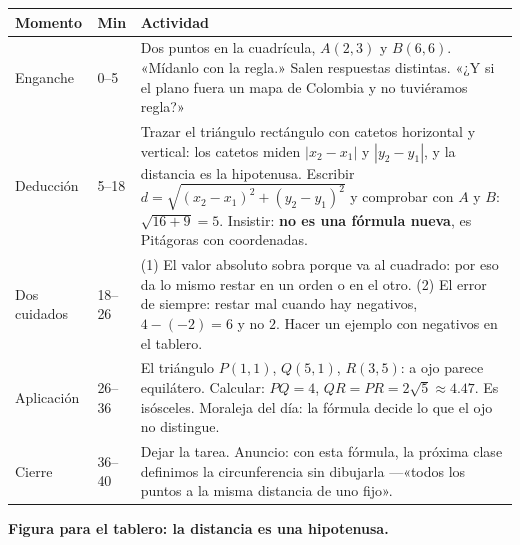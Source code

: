 \documentclass[11pt]{article}
\begin{document}
\begin{center}
{\renewcommand{\arraystretch}{1.3}
\begin{tabularx}{\linewidth}{@{}l l X@{}}
  \toprule
  \textbf{Momento} & \textbf{Min} & \textbf{Actividad}\\
  \midrule
  Enganche & 0--5 & Dos puntos en la cuadrícula, $A(2,3)$ y $B(6,6)$. «Mídanlo con la
    regla.» Salen respuestas distintas. «¿Y si el plano fuera un mapa de Colombia y no
    tuviéramos regla?»\\
  Deducción & 5--18 & Trazar el triángulo rectángulo con catetos horizontal y vertical:
    los catetos miden $|x_2 - x_1|$ y $|y_2 - y_1|$, y la distancia es la hipotenusa.
    Escribir $d = \sqrt{(x_2-x_1)^2 + (y_2-y_1)^2}$ y comprobar con $A$ y $B$: $\sqrt{16+9}
    = 5$. Insistir: \textbf{no es una fórmula nueva}, es Pitágoras con coordenadas.\\
  Dos cuidados & 18--26 & (1) El valor absoluto sobra porque va al cuadrado: por eso da lo
    mismo restar en un orden o en el otro. (2) El error de siempre: restar mal cuando hay
    negativos, $4 - (-2) = 6$ y no $2$. Hacer un ejemplo con negativos en el tablero.\\
  Aplicación & 26--36 & El triángulo $P(1,1)$, $Q(5,1)$, $R(3,5)$: a ojo parece
    equilátero. Calcular: $PQ = 4$, $QR = PR = 2\sqrt{5} \approx \num{4,47}$. Es isósceles.
    Moraleja del día: la fórmula decide lo que el ojo no distingue.\\
  Cierre & 36--40 & Dejar la tarea. Anuncio: con esta fórmula, la próxima clase definimos
    la circunferencia sin dibujarla —«todos los puntos a la misma distancia de uno fijo».\\
  \bottomrule
\end{tabularx}}
\end{center}

\textbf{Figura para el tablero: la distancia es una hipotenusa.}

\begin{center}
\end{center}
\end{document}
